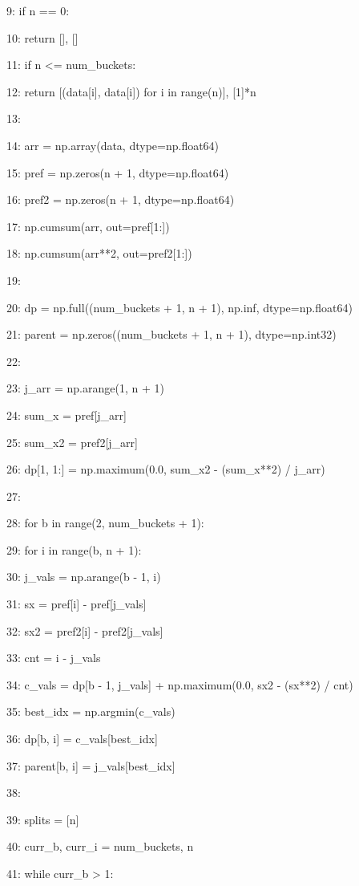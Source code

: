 \documentclass[11pt,a4paper]{article}
\begin{document}
9:     if n == 0:

10:         return [], []

11:     if n <= num\_buckets:

12:         return [(data[i], data[i]) for i in range(n)], [1]*n

13:

14:     arr = np.array(data, dtype=np.float64)

15:     pref = np.zeros(n + 1, dtype=np.float64)

16:     pref2 = np.zeros(n + 1, dtype=np.float64)

17:     np.cumsum(arr, out=pref[1:])

18:     np.cumsum(arr**2, out=pref2[1:])

19:

20:     dp = np.full((num\_buckets + 1, n + 1), np.inf, dtype=np.float64)

21:     parent = np.zeros((num\_buckets + 1, n + 1), dtype=np.int32)

22:

23:     j\_arr = np.arange(1, n + 1)

24:     sum\_x = pref[j\_arr]

25:     sum\_x2 = pref2[j\_arr]

26:     dp[1, 1:] = np.maximum(0.0, sum\_x2 - (sum\_x**2) / j\_arr)

27:

28:     for b in range(2, num\_buckets + 1):

29:         for i in range(b, n + 1):

30:             j\_vals = np.arange(b - 1, i)

31:             sx = pref[i] - pref[j\_vals]

32:             sx2 = pref2[i] - pref2[j\_vals]

33:             cnt = i - j\_vals

34:             c\_vals = dp[b - 1, j\_vals] + np.maximum(0.0, sx2 - (sx**2) / cnt)

35:             best\_idx = np.argmin(c\_vals)

36:             dp[b, i] = c\_vals[best\_idx]

37:             parent[b, i] = j\_vals[best\_idx]

38:

39:     splits = [n]

40:     curr\_b, curr\_i = num\_buckets, n

41:     while curr\_b > 1:
\end{document}
